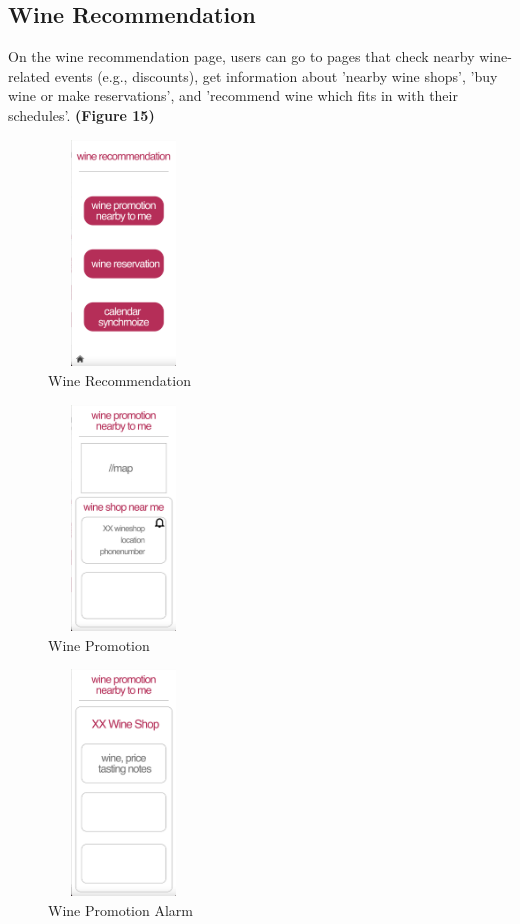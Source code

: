 \documentclass[sigconf, nonacm]{acmart}
\begin{document}
\noindent \subsection{Wine Recommendation}

On the wine recommendation page, users can go to
pages that check nearby wine-related events (e.g.,
discounts), get information about ’nearby wine shops’,
’buy wine or make reservations’, and ’recommend
wine which fits in with their schedules’. \textbf{(Figure 15)}

\begin{figure}
  \centering
  \includegraphics[width=4cm, height=6cm]{winerec.png}
  \caption{Wine Recommendation}
  \label{fig:wine recommendation}
\end{figure}

\begin{figure}
  \centering
  \includegraphics[width=4cm, height=6cm]{winepromo.png}
  \caption{Wine Promotion}
  \label{fig:wine promotion}
\end{figure}


\begin{figure}
  \centering
  \includegraphics[width=4cm, height=6cm]{winepromoalarm.png}
  \caption{Wine Promotion Alarm}
  \label{fig:wine promotion alarm}
\end{figure}
\end{document}
